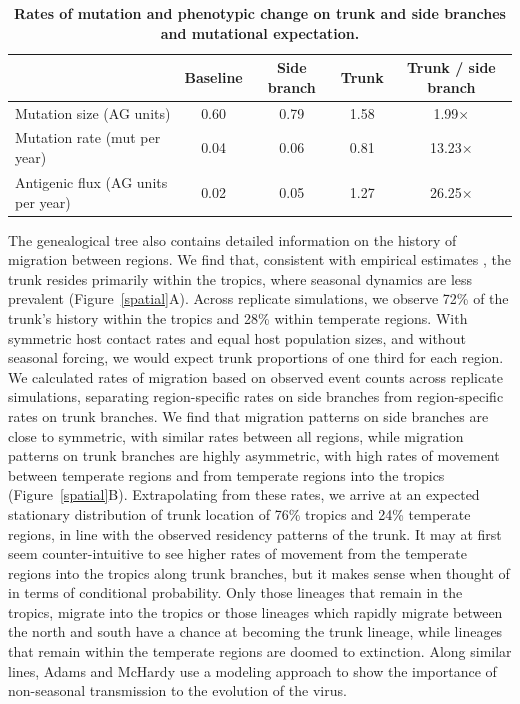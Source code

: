 \documentclass[11pt,oneside,letterpaper]{article}
\begin{document}
\begin{table}[tb]
	\centering
	\caption{\textbf{Rates of mutation and phenotypic change on trunk and side branches and mutational expectation.}}
	\label{mktable}
	\begin{tabular*}{1.0\textwidth}{ l c c c c } 
	\hline
		 								& Baseline 	& Side branch 	& Trunk		& Trunk / side branch \\
	\hline				
	Mutation size (AG units)			& 0.60		& 0.79			& 1.58		& 1.99$\times$ \\
	Mutation rate (mut per year)		& 0.04		& 0.06			& 0.81		& 13.23$\times$ \\	
	Antigenic flux (AG units per year)	& 0.02		& 0.05			& 1.27		& 26.25$\times$ \\		
	\hline
	\end{tabular*}
\end{table}


The genealogical tree also contains detailed information on the history of migration between regions.  We find that, consistent with empirical estimates \cite{Russell08,Bedford10}, the trunk resides primarily within the tropics, where seasonal dynamics are less prevalent (Figure~\ref{spatial}A).  Across replicate simulations, we observe 72\% of the trunk's history within the tropics and 28\% within temperate regions.  With symmetric host contact rates and equal host population sizes, and without seasonal forcing, we would expect trunk proportions of one third for each region.  We calculated rates of migration based on observed event counts across replicate simulations, separating region-specific rates on side branches from region-specific rates on trunk branches.  We find that migration patterns on side branches are close to symmetric, with similar rates between all regions, while migration patterns on trunk branches are highly asymmetric, with high rates of movement between temperate regions and from temperate regions into the tropics (Figure~\ref{spatial}B).  Extrapolating from these rates, we arrive at an expected stationary distribution of trunk location of 76\% tropics and 24\% temperate regions, in line with the observed residency patterns of the trunk.  It may at first seem counter-intuitive to see higher rates of movement from the temperate regions into the tropics along trunk branches, but it makes sense when thought of in terms of conditional probability.  Only those lineages that remain in the tropics, migrate into the tropics or those lineages which rapidly migrate between the north and south have a chance at becoming the trunk lineage, while lineages that remain within the temperate regions are doomed to extinction.  Along similar lines, Adams and McHardy \cite{Adams11} use a modeling approach to show the importance of non-seasonal transmission to the evolution of the virus.
\end{document}
